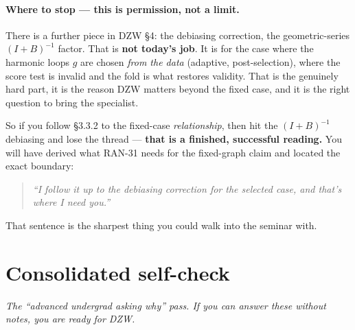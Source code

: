 \documentclass[11pt,a4paper]{article}
\theoremstyle{definition}
\begin{document}
\paragraph{Where to stop --- this is permission, not a limit.}
There is a further piece in DZW \S4: the debiasing correction, the
geometric-series $(I+B)^{-1}$ factor. That is \textbf{not today's job}. It is for
the case where the harmonic loops $g$ are chosen \emph{from the data} (adaptive,
post-selection), where the score test is invalid and the fold is what restores
validity. That is the genuinely hard part, it is the reason DZW matters beyond
the fixed case, and it is the right question to bring the specialist.

So if you follow \S3.3.2 to the fixed-case \emph{relationship}, then hit the
$(I+B)^{-1}$ debiasing and lose the thread --- \textbf{that is a finished,
successful reading.} You will have derived what RAN-31 needs for the fixed-graph
claim and located the exact boundary:

\begin{quote}
\emph{``I follow it up to the debiasing correction for the selected case, and
that's where I need you.''}
\end{quote}

\noindent That sentence is the sharpest thing you could walk into the seminar
with.

\section{Consolidated self-check}

\emph{The ``advanced undergrad asking why'' pass. If you can answer these without
notes, you are ready for DZW.}
\end{document}

